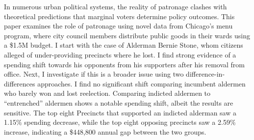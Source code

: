 \begin{spacing}{1.0}
    In numerous urban political systems, the reality of patronage clashes with theoretical predictions that marginal voters determine policy outcomes. This paper examines the role of patronage
    using novel data from Chicago’s menu program, where city council members distribute public
    goods in their wards using a \$1.5M budget. 
    I start with the case of Alderman Bernie Stone, whom citizens alleged of under-providing precincts where he lost. 
    I find strong evidence of a spending shift towards his opponents from his supporters after his removal from office. 
    Next, I investigate if this is a broader issue using two difference-in-differences approaches. 
    I find no significant shift comparing incumbent aldermen who barely won and lost reelection. 
    Comparing indicted aldermen to “entrenched” aldermen shows a notable spending shift, albeit the results are sensitive.
    The top eight Precincts that supported an indicted alderman saw a 1.15\% spending decrease, while the top eight opposing precincts saw a 2.59\% increase, indicating a \$448,800 annual gap between the two groups.
\end{spacing}